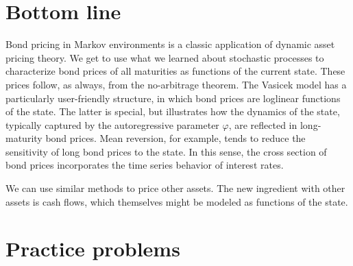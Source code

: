 \documentclass[11pt]{article}
\begin{document}
\begin{comment}
\section{The theory of long rates}
****** ???? *****
Perron-Frobenius stuff ???
\end{comment}


\section*{Bottom line}

Bond pricing in Markov environments is a classic application of dynamic asset pricing theory.
We get to use what we learned about stochastic processes to characterize
bond prices of all maturities as functions of the current state.
These prices follow, as always, from the no-arbitrage theorem.
The Vasicek model has a particularly user-friendly structure,
in which bond prices are loglinear functions of the state.
The latter is special, but illustrates how the dynamics of the state,
typically captured by the autoregressive parameter $\varphi$,
are reflected in long-maturity bond prices.
Mean reversion, for example, tends to reduce the sensitivity
of long bond prices to the state.
In this sense, the cross section of bond prices
incorporates the time series behavior of interest rates.

We can use similar methods to price other assets.
The new ingredient with other assets is cash flows,
which themselves might be modeled as functions of the state.


\section*{Practice problems}
\end{document}
